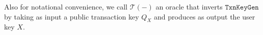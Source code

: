 \documentclass{mrl}
\theoremstyle{definition}
\begin{document}
% 


Also for notational convenience, we call $\mathcal{T}(-)$ an oracle that inverts $\texttt{TxnKeyGen}$ by taking as input a public transaction key $Q_X$ and produces as output the user key $X$.



\end{document}
